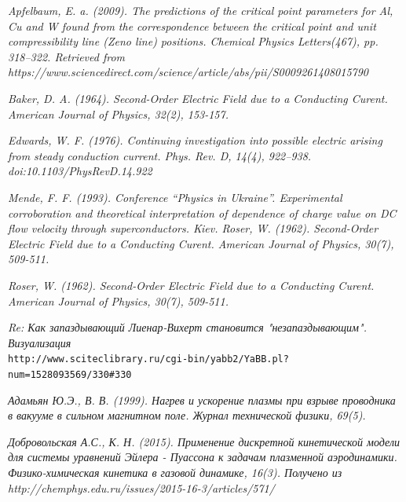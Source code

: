 \documentclass[12pt]{article}
\begin{document}
\begin{thebibliography}{99}

\textit{Apfelbaum, E. a. (2009). The predictions of the critical point parameters for Al, Cu and W found from the correspondence between the critical point and unit compressibility line (Zeno line) positions. Chemical Physics Letters(467), pp. 318–322. Retrieved from https://www.sciencedirect.com/science/article/abs/pii/S0009261408015790}

\textit{Baker, D. A. (1964). Second-Order Electric Field due to a Conducting Curent. American Journal of Physics, 32(2), 153-157.}

\textit{Edwards, W. F. (1976). Continuing investigation into possible electric arising from steady conduction current. Phys. Rev. D, 14(4), 922--938. doi:10.1103/PhysRevD.14.922}

\textit{Mende, F. F. (1993). Conference “Physics in Ukraine”. Experimental corroboration and theoretical interpretation of dependence of charge value on DC flow velocity through superconductors. Kiev.
Roser, W. (1962). Second-Order Electric Field due to a Conducting Curent. American Journal of Physics, 30(7), 509-511.}

\textit{Roser, W. (1962). Second-Order Electric Field due to a Conducting Curent. American Journal of Physics, 30(7), 509-511.}

\textit{Re: Как запаздывающий Лиенар-Вихерт становится "незапаздывающим". Визуализация}
\\\texttt{http://www.sciteclibrary.ru/cgi-bin/yabb2/YaBB.pl?num=1528093569/330\#330}



\textit{Адамьян Ю.Э., В. В. (1999). Нагрев и ускорение плазмы при взрыве проводника в вакууме в сильном магнитном поле. Журнал технической физики, 69(5).}

\textit{Добровольская А.С., К. Н. (2015). Применение дискретной кинетической модели для системы уравнений Эйлера - Пуассона к задачам плазменной аэродинамики. Физико-химическая кинетика в газовой динамике, 16(3). Получено из http://chemphys.edu.ru/issues/2015-16-3/articles/571/}


\end{thebibliography}
\end{document}
